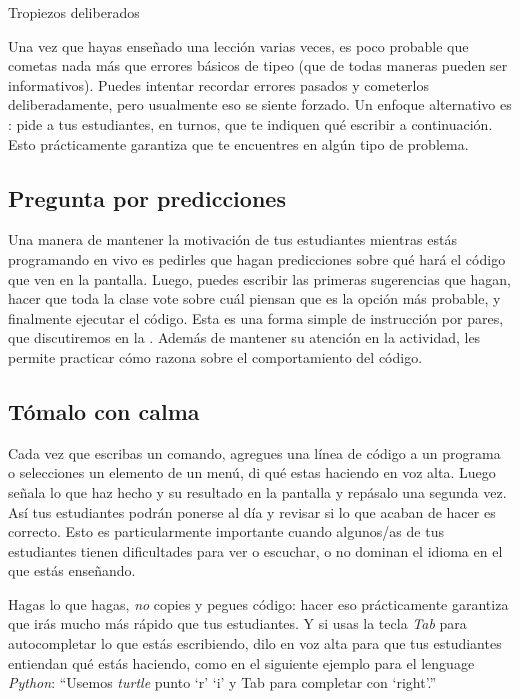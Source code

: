 \begin{aside}{Tropiezos deliberados}
  
  Una vez que hayas enseñado una lección varias veces,
  es poco probable que cometas nada más que errores básicos de tipeo
  (que de todas maneras pueden ser informativos).
  Puedes intentar recordar errores pasados y cometerlos deliberadamente,
  pero usualmente eso se siente forzado.
  Un enfoque alternativo es :
  pide a tus estudiantes, en turnos, que te indiquen qué escribir a continuación.
  Esto prácticamente garantiza que te encuentres en algún tipo de problema.
\end{aside}

\subsection*{Pregunta por predicciones}

Una manera de mantener la motivación de tus estudiantes mientras estás programando en vivo
es pedirles que hagan predicciones sobre qué hará el código que ven en la pantalla.
Luego, puedes escribir las primeras sugerencias que hagan,
hacer que toda la clase vote sobre cuál piensan que es la opción más probable,
y finalmente ejecutar el código.
Esta es una forma simple de instrucción por pares,
que discutiremos en la .
Además de mantener su atención en la actividad,
les permite practicar cómo razona sobre el comportamiento del código.

\subsection*{Tómalo con calma}

Cada vez que escribas un comando,
agregues una línea de código a un programa
o selecciones un elemento de un menú,
di qué estas haciendo en voz alta.
Luego señala lo que haz hecho y su resultado en la pantalla
y repásalo una segunda vez.
Así tus estudiantes podrán ponerse al día
y revisar si lo que acaban de hacer es correcto.
Esto es particularmente importante cuando algunos/as de tus estudiantes tienen 
dificultades para ver o escuchar, o no dominan el idioma en el que estás enseñando.

Hagas lo que hagas,
\emph{no} copies y pegues código:
hacer eso prácticamente garantiza que irás mucho más rápido que tus estudiantes.
Y si usas la tecla \emph{Tab} para autocompletar lo que estás escribiendo,
dilo en voz alta para que tus estudiantes entiendan qué estás haciendo, 
como en el siguiente ejemplo para el lenguage \emph{Python}:
``Usemos \emph{turtle} punto `r' `i' y Tab para completar con `right'.''

